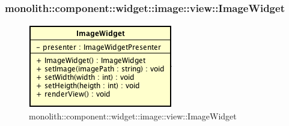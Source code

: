 \subsubsection{monolith::component::widget::image::view::ImageWidget}

\label{monolith::component::widget::image::view::ImageWidget}
\begin{figure}[ht]
	\centering
	\includegraphics[scale=0.5]{Sezioni/SottosezioniST/img/ImageWidget.png}
	\caption{monolith::component::widget::image::view::ImageWidget}
\end{figure}


